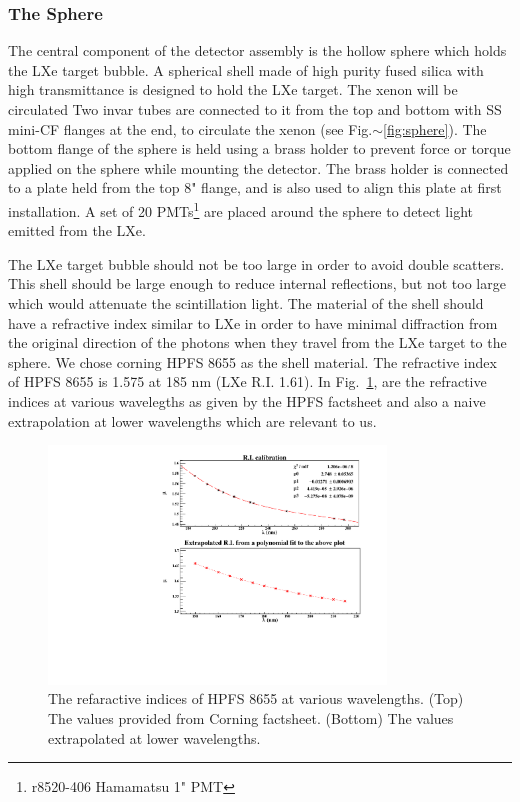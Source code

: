 \subsubsection{The Sphere}
\label{subsubsec:sphere}

The central component of the detector assembly is the hollow sphere which holds the LXe target bubble. A spherical 
shell made of high purity fused silica with high transmittance is designed to hold the LXe target.
 The xenon will be circulated Two invar tubes are connected to it from the top and bottom with 
SS mini-CF flanges at the end, to circulate the xenon (see Fig.$\sim$\ref{fig:sphere}). 
The bottom flange of the sphere is held using a brass holder to prevent force or torque applied on the sphere while mounting the detector. The 
brass holder is connected to a plate held from the top 8" flange, and is also used to align this plate at first installation.
A set of 20 PMTs\footnote{r8520-406 Hamamatsu 1" PMT} are placed around the sphere to detect light emitted 
from the LXe.


The LXe target bubble should not be too large in order to avoid double scatters. This shell should be large enough to 
reduce internal reflections, but not too large which would attenuate the scintillation light. The material of the shell 
should have a refractive index similar to LXe in order to have minimal 
diffraction from the original direction of the photons when they travel from the LXe target to the sphere. 
We chose corning HPFS 8655 as the shell material. The refractive index of HPFS 8655 is 1.575 at 185 nm (LXe R.I. 1.61). 
 In Fig.~\ref{fig:hpfsRIcalibration}, 
are the refractive indices at various wavelegths as given by the HPFS factsheet and also a naive extrapolation at lower 
wavelengths which are relevant to us. %

\begin{figure}
   \centering
   \includegraphics[width=0.8\textwidth]{RI-calibration.pdf}
   \caption{The refaractive indices of HPFS 8655 at various wavelengths. (Top) The values provided from Corning factsheet.
   (Bottom) The values extrapolated at lower wavelengths.} 
   \label{fig:hpfsRIcalibration}
\end{figure}

